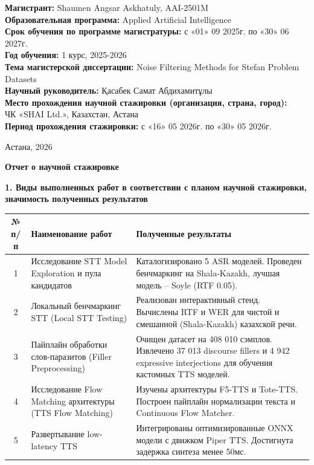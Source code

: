 \documentclass[12pt,a4paper]{article}
\begin{document}
\vspace{5mm}

\noindent \textbf{Магистрант:} Shaumen Angsar Askhatuly, AAI-2501M\\[2mm]
\textbf{Образовательная программа:} Applied Artificial Intelligence\\[2mm]
\textbf{Срок обучения по программе магистратуры:} с «01» 09 2025г. по «30» 06 2027г.\\[2mm]
\textbf{Год обучения:} 1 курс, 2025-2026\\[2mm]
\textbf{Тема магистерской диссертации:} Noise Filtering Methods for Stefan Problem Datasets\\[2mm]
\textbf{Научный руководитель:} Қасабек Самат Абдихамитұлы\\[2mm]
\textbf{Место прохождения научной стажировки (организация, страна, город):}\\
ЧК «SHAI Ltd.», Казахстан, Астана\\[2mm]
\textbf{Период прохождения стажировки:} с «16» 05 2026г. по «30» 05 2026г.

\vspace{5mm}
\begin{center}
Астана, 2026
\end{center}

\vspace{5mm}
\begin{center}
\textbf{Отчет о научной стажировке}
\end{center}

\noindent \textbf{1. Виды выполненных работ в соответствии с планом научной стажировки, значимость полученных результатов}

\vspace{2mm}
\noindent
\begin{tabularx}{\textwidth}{|c|X|X|}
\hline
\textbf{№ п/п} & \textbf{Наименование работ} & \textbf{Полученные результаты} \\
\hline
1 & Исследование STT Model Exploration и пула кандидатов & Каталогизировано 5 ASR моделей. Проведен бенчмаркинг на Shala-Kazakh, лучшая модель -- Soyle (RTF 0.05). \\
\hline
2 & Локальный бенчмаркинг STT (Local STT Testing) & Реализован интерактивный стенд. Вычислены RTF и WER для чистой и смешанной (Shala-Kazakh) казахской речи. \\
\hline
3 & Пайплайн обработки слов-паразитов (Filler Preprocessing) & Очищен датасет на 408 010 сэмплов. Извлечено 37 013 discourse fillers и 4 942 expressive interjections для обучения кастомных TTS моделей. \\
\hline
4 & Исследование Flow Matching архитектуры (TTS Flow Matching) & Изучены архитектуры F5-TTS и Tote-TTS. Построен пайплайн нормализации текста и Continuous Flow Matcher. \\
\hline
5 & Развертывание low-latency TTS & Интегрированы оптимизированные ONNX модели с движком Piper TTS. Достигнута задержка синтеза менее 50мс. \\
\hline
\end{tabularx}
\end{document}
